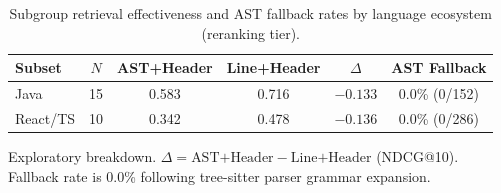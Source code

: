 \begin{table}[t]
\caption{Subgroup retrieval effectiveness and AST fallback rates by language ecosystem (reranking tier).}
\label{tab:language_subgroup}
\centering\footnotesize
\setlength{\tabcolsep}{3pt}
\begin{threeparttable}
\begin{tabular}{@{}lccccc@{}}
\toprule
Subset & $N$ & AST+Header & Line+Header & $\Delta$ & AST Fallback \\
\midrule
Java & 15 & 0.583 & 0.716 & $-0.133$ & 0.0\% (0/152) \\
React/TS & 10 & 0.342 & 0.478 & $-0.136$ & 0.0\% (0/286) \\
\bottomrule
\end{tabular}
\begin{tablenotes}\footnotesize
\item[] Exploratory breakdown. $\Delta = \text{AST+Header} - \text{Line+Header}$ (NDCG@10). Fallback rate is 0.0\% following tree-sitter parser grammar expansion.
\end{tablenotes}
\end{threeparttable}
\end{table}